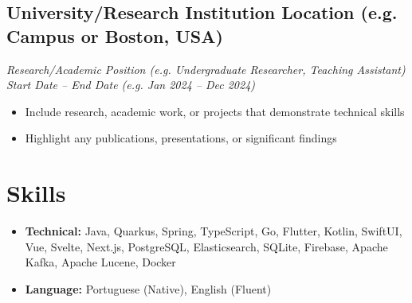 \documentclass[a4paper,10pt]{article}
\begin{document}
    \subsection*{\texorpdfstring{
        \textbf{University/Research Institution} \hfill Location (e.g. Campus or Boston, USA)
        }{
            University/Research Institution -- Location
        }}
    \textit{Research/Academic Position (e.g. Undergraduate Researcher, Teaching Assistant) \hfill Start Date – End Date (e.g. Jan 2024 – Dec 2024)}
        \begin{itemize}
            \item Include research, academic work, or projects that demonstrate technical skills
            \item Highlight any publications, presentations, or significant findings
        \end{itemize}


\section{Skills}
    \begin{itemize}
        \item \textbf{Technical:} Java, Quarkus, Spring, TypeScript, Go, Flutter, Kotlin, SwiftUI, Vue, Svelte, Next.js, PostgreSQL, Elasticsearch, SQLite, Firebase, Apache Kafka, Apache Lucene, Docker
        \item \textbf{Language:} Portuguese (Native), English (Fluent)
    \end{itemize}
\end{document}
